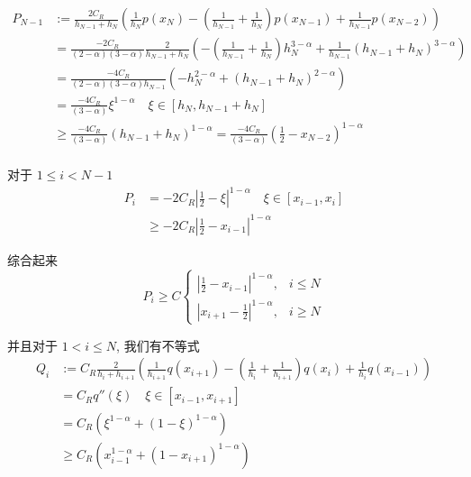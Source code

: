 \documentclass{ctexart}
\begin{document}
\begin{equation}
    \begin{aligned}
        P_{N-1} & := \frac{2C_R}{h_{N-1} + h_{N}}
        \left( \frac{1}{h_{N}} p(x_{N})
        - (\frac{1}{h_{N-1}}+\frac{1}{h_{N}}) p(x_{N-1})
        +  \frac{1}{h_{N-1}} p(x_{N-2}) \right)     \\
        & = \frac{-2 C_R}{(2-\alpha)(3-\alpha)} \frac{2}{h_{N-1} + h_{N}}
        \left( - (\frac{1}{h_{N-1}}+\frac{1}{h_{N}}) h_N^{3-\alpha}
        +  \frac{1}{h_{N-1}} (h_{N-1}+h_{N})^{3-\alpha} \right) \\
        & = \frac{-4 C_R}{(2-\alpha)(3-\alpha) h_{N-1}}
        \left( - h_{N}^{2-\alpha}
        +  (h_{N-1}+h_{N})^{2-\alpha} \right) \\
        & = \frac{-4 C_R}{(3-\alpha)} \xi^{1-\alpha}    \quad \xi \in [h_N, h_{N-1}+h_{N}]     \\
        & \ge \frac{-4 C_R}{(3-\alpha)} (h_{N-1}+h_{N})^{1-\alpha} = \frac{-4 C_R}{(3-\alpha)} (\frac{1}{2} - x_{N-2})^{1-\alpha} \\
    \end{aligned}
\end{equation}

对于 \(1\le i<N-1\)
\begin{equation}
    \begin{aligned}
        P_{i} & = -2 C_R |\frac{1}{2} - \xi|^{1-\alpha}  \quad \xi \in [x_{i-1}, x_i] \\
        &\ge -2 C_R |\frac{1}{2} - x_{i-1}|^{1-\alpha}
    \end{aligned}
\end{equation}

综合起来
\begin{equation}
    P_i \ge C\begin{cases}
        |\frac{1}{2} - x_{i-1}|^{1-\alpha} , & i\le N   \\
        |x_{i+1} - \frac{1}{2}|^{1-\alpha} , & i\ge N
    \end{cases}
\end{equation}


并且对于 \(1<i\le N\), 我们有不等式
\begin{equation}
    \begin{aligned}
        Q_i & := C_R\frac{2}{h_i + h_{i+1}}
        \left( \frac{1}{h_{i+1}} q(x_{i+1})
        - (\frac{1}{h_{i}}+\frac{1}{h_{i+1}}) q(x_{i})
        +  \frac{1}{h_{i}} q(x_{i-1}) \right)       \\
        & = C_R q''(\xi)        \quad \xi \in [x_{i-1}, x_{i+1}]    \\
        & = C_R (\xi^{1-\alpha} + (1-\xi)^{1-\alpha})   \\
        &\ge C_R (x_{i-1}^{1-\alpha} + (1-x_{i+1})^{1-\alpha})
    \end{aligned}
\end{equation}
\end{document}
